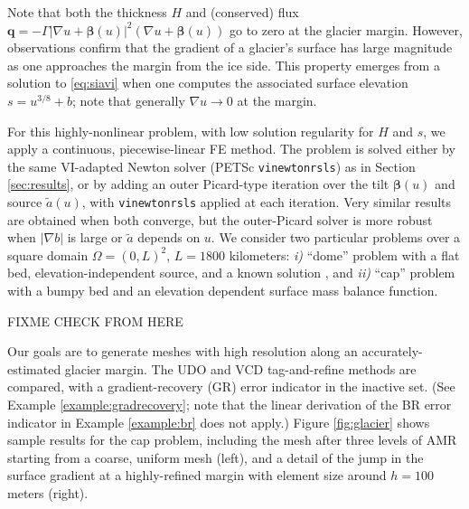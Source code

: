 \documentclass[]{interact}
\theoremstyle{plain}%
\theoremstyle{definition}
\theoremstyle{remark}
\newcommand{\grad}{\nabla}
\newcommand{\bq}{\mathbf{q}}
\begin{document}
Note that both the thickness $H$ and (conserved) flux $\bq = - \Gamma |\grad u + \bm{\beta}(u)|^2 (\grad u + \bm{\beta}(u))$ go to zero at the glacier margin.  However, observations confirm that the gradient of a glacier's surface has large magnitude as one approaches the margin from the ice side.  This property emerges from a solution to \eqref{eq:siavi} when one computes the associated surface elevation $s=u^{3/8} + b$; note that generally $\grad u\to 0$ at the margin.

For this highly-nonlinear problem, with low solution regularity for $H$ and $s$, we apply a continuous, piecewise-linear FE method.  The problem is solved either by the same VI-adapted Newton solver (PETSc \texttt{vinewtonrsls}) as in Section \ref{sec:results}, or by adding an outer Picard-type iteration over the tilt $\bm{\beta}(u)$ \cite{JouvetBueler2012} and source $\tilde a(u)$, with \texttt{vinewtonrsls} applied at each iteration.  Very similar results are obtained when both converge, but the outer-Picard solver is more robust when $|\grad b|$ is large or $\tilde a$ depends on $u$.  We consider two particular problems over a square domain $\Omega=(0,L)^2$, $L=1800$ kilometers: \emph{i)} ``dome'' problem with a flat bed, elevation-independent source, and a known solution \cite{Bueler2016}, and \emph{ii)} ``cap'' problem with a bumpy bed \cite[Example 8.4]{BuelerFarrell2024} and an elevation dependent surface mass balance function.

FIXME CHECK FROM HERE

Our goals are to generate meshes with high resolution along an accurately-estimated glacier margin.  The UDO and VCD tag-and-refine methods are compared, with a gradient-recovery (GR) error indicator in the inactive set.  (See Example \ref{example:gradrecovery}; note that the linear derivation of the BR error indicator in Example \ref{example:br} does not apply.)  Figure \ref{fig:glacier} shows sample results for the cap problem, including the mesh after three levels of AMR starting from a coarse, uniform mesh (left), and a detail of the jump in the surface gradient at a highly-refined margin with element size around $h = 100$ meters (right).
\end{document}
